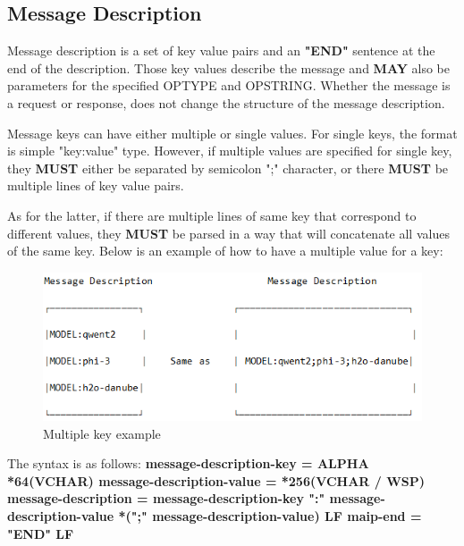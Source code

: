 \documentclass{article}
\begin{document}
\subsection{Message Description}
Message description is a set of key value pairs and an \textbf{"END"} sentence at the end of the description. Those key values describe the message and \textbf{MAY} also be parameters for the specified OPTYPE and OPSTRING. Whether the message is a request or response, does not change the structure of the message description.\newline

Message keys can have either multiple or single values. 	For single keys, the format is simple "key:value" type. However, if multiple values are specified for single key, they \textbf{MUST} either be separated by semicolon ";" character, or there \textbf{MUST} be multiple lines of key value pairs.\newline

As for the latter, if there are multiple lines of same key that correspond to different values, they \textbf{MUST} be parsed in a way that will concatenate all values of the same key. Below is an example of how to have a multiple value for a key: \newline

\begin{figure}[h!]
  \centering
  \includegraphics[width=1\textwidth]{multiple_keys.png}
  \caption{Multiple key example}
\end{figure}

The syntax is as follows:\newline
\textbf{
\newline
message-description-key = ALPHA *64(VCHAR)\newline
message-description-value = *256(VCHAR / WSP)\newline
message-description = message-description-key ":" message-description-value *(";" message-description-value) LF\newline
maip-end = "END" LF\newline
}
\end{document}
